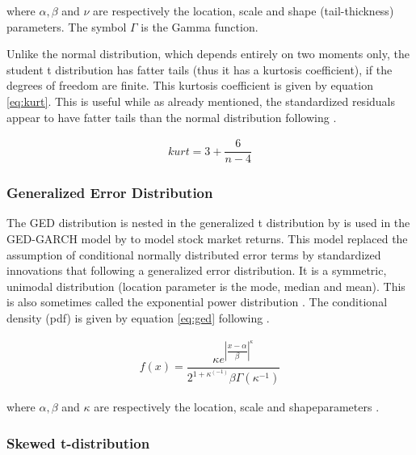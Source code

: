 \documentclass[a4paper, twoside]{templates/ociamthesis}
\begin{document}
\noindent where \(\alpha, \beta\) and \(\nu\) are respectively the location, scale and shape (tail-thickness) parameters. The symbol \(\Gamma\) is the Gamma function.

\noindent Unlike the normal distribution, which depends entirely on two moments only, the student t distribution has fatter tails (thus it has a kurtosis coefficient), if the degrees of freedom are finite. This kurtosis coefficient is given by equation \eqref{eq:kurt}. This is useful while as already mentioned, the standardized residuals appear to have fatter tails than the normal distribution following \textcite{bollerslev2008}.

\begin{align}
kurt = 3 + \dfrac{6}{n-4}
 \label{eq:kurt}
\end{align}

\hypertarget{generalized-error-distribution}{%
\subsubsection{Generalized Error Distribution}\label{generalized-error-distribution}}

\noindent The GED distribution is nested in the generalized t distribution by \textcite{mcdonald1988} is used in the GED-GARCH model by \textcite{nelson1991} to model stock market returns. This model replaced the assumption of conditional normally distributed error terms by standardized innovations that following a generalized error distribution. It is a symmetric, unimodal distribution (location parameter is the mode, median and mean). This is also sometimes called the exponential power distribution \autocite{bollerslev2008}. The conditional density (pdf) is given by equation \eqref{eq:ged} following \textcite{ghalanos2020}.

\begin{align}
f(x) = \dfrac{\kappa e^{\left|\dfrac{x-\alpha}{\beta}\right|^\kappa}}{2^{1+\kappa^(-1)}\beta\Gamma(\kappa^{-1})}
 \label{eq:ged}
\end{align}

where \(\alpha, \beta\) and \(\kappa\) are respectively the location, scale and shapeparameters .

\hypertarget{skewed-t-distribution}{%
\subsubsection{Skewed t-distribution}\label{skewed-t-distribution}}
\end{document}
